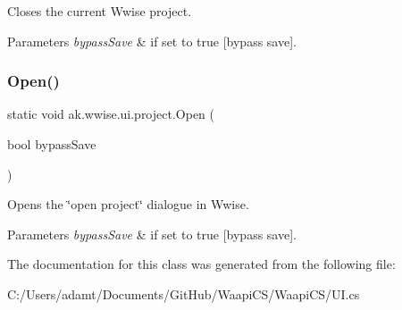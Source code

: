 Closes the current Wwise project. 


\begin{DoxyParams}{Parameters}
{\em bypass\+Save} & if set to {\ttfamily true} \mbox{[}bypass save\mbox{]}.\\
\hline
\end{DoxyParams}
\mbox{\label{classak_1_1wwise_1_1ui_1_1project_a131d440311080d8d181c1b50bb2dabcf}} 
\subsubsection{\texorpdfstring{Open()}{Open()}}
{\footnotesize\ttfamily static void ak.\+wwise.\+ui.\+project.\+Open (\begin{DoxyParamCaption}\item[{bool}]{bypass\+Save }\end{DoxyParamCaption})\hspace{0.3cm}{\ttfamily [static]}}



Opens the \char`\"{}open project\char`\"{} dialogue in Wwise. 


\begin{DoxyParams}{Parameters}
{\em bypass\+Save} & if set to {\ttfamily true} \mbox{[}bypass save\mbox{]}.\\
\hline
\end{DoxyParams}


The documentation for this class was generated from the following file\+:\begin{DoxyCompactItemize}
\item 
C\+:/\+Users/adamt/\+Documents/\+Git\+Hub/\+Waapi\+C\+S/\+Waapi\+C\+S/U\+I.\+cs\end{DoxyCompactItemize}
